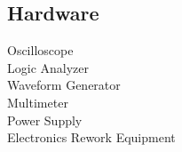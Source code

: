 \documentclass[]{deedy-resume-openfont}
\begin{document}
\begin{minipage}[t]{0.33\textwidth}
\subsection{Hardware}
Oscilloscope\\
Logic Analyzer \\
Waveform Generator\\
Multimeter \\
Power Supply \\
Electronics Rework Equipment \\
\sectionsep



%
%

\end{minipage} 
\hfill
\end{document}

